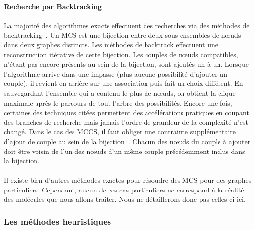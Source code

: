 \documentclass[12pt,french,twoside]{report}
\begin{document}
\paragraph{Recherche par Backtracking}
La majorité des algorithmes exacts effectuent des recherches via des méthodes de backtracking~\cite{manic_branch&cut_2009,mcgregor_backtrack_1982,kawabata_build-up_2011}.
Un MCS est une bijection entre deux sous ensembles de n\oe{}uds dans deux graphes distincts.
Les méthodes de backtrack effectuent une reconstruction itérative de cette bijection.
Les couples de n\oe{}uds compatibles, n'étant pas encore présents au sein de la bijection, sont ajoutés un à un.
Lorsque l'algorithme arrive dans une impasse (plus aucune possibilité d'ajouter un couple), il revient en arrière sur une association puis fait un choix différent.
En sauvegardant l'ensemble qui a contenu le plus de n\oe{}uds, on obtient la clique maximale après le parcours de tout l'arbre des possibilités.
Encore une fois, certaines des techniques citées permettent des accélérations pratiques en coupant des branches de recherche mais jamais l'ordre de grandeur de la complexité n'est changé.
Dans le cas des MCCS, il faut obliger une contrainte supplémentaire d'ajout de couple au sein de la bijection~\cite{chang_moderately_2014}.
Chacun des n\oe{}uds du couple à ajouter doit être voisin de l'un des n\oe{}uds d'un même couple précédemment inclus dans la bijection.

\paragraph{}Il existe bien d'autres méthodes exactes pour résoudre des MCS pour des graphes particuliers.
Cependant, aucun de ces cas particuliers ne correspond à la réalité des molécules que nous allons traiter.
Nous ne détaillerons donc pas celles-ci ici.


\subsubsection{Les méthodes heuristiques}
\end{document}
